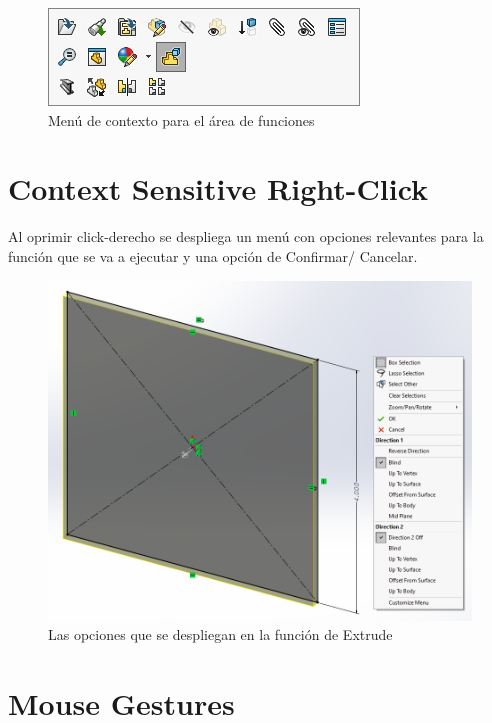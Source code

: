 \documentclass{report}
\begin{document}
\begin{figure}[H]
	\centering
	\includegraphics[width=0.75\linewidth, height=0.5\textheight,keepaspectratio]{Imagenes/solidworks_contextmenu_04}
	\caption{Menú de contexto para el área de funciones}
	\label{fig:solidworkscontextmenu04}
\end{figure}

\chapter{Context Sensitive Right-Click}

Al oprimir click-derecho se despliega un menú con opciones relevantes para la función que se va a ejecutar y una opción de Confirmar/ Cancelar.

\begin{figure}[H]
	\centering
	\includegraphics[width=0.85\linewidth, height=0.5\textheight,keepaspectratio]{Imagenes/solidworks_contextrightclick01}
	\caption{Las opciones que se despliegan en la función de Extrude}
	\label{fig:solidworkscontextrightclick01}
\end{figure}


\chapter{Mouse Gestures}
\end{document}
